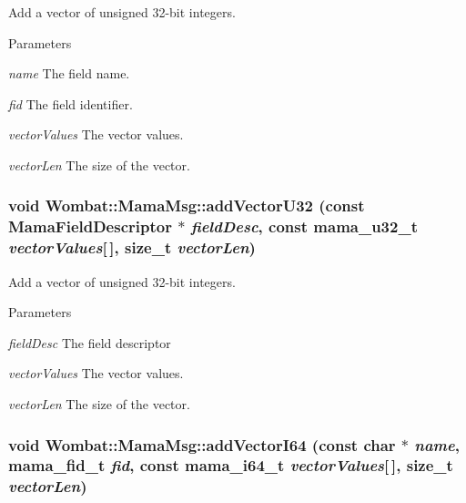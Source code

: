 Add a vector of unsigned 32-\/bit integers. 
\begin{DoxyParams}{Parameters}
\item[{\em name}]The field name. \item[{\em fid}]The field identifier. \item[{\em vectorValues}]The vector values. \item[{\em vectorLen}]The size of the vector. \end{DoxyParams}
\hypertarget{classWombat_1_1MamaMsg_a62c496a76fcfa4a772fa1770115570cd}{
\subsubsection[{addVectorU32}]{\setlength{\rightskip}{0pt plus 5cm}void Wombat::MamaMsg::addVectorU32 (const {\bf MamaFieldDescriptor} $\ast$ {\em fieldDesc}, \/  const mama\_\-u32\_\-t {\em vectorValues}\mbox{[}$\,$\mbox{]}, \/  size\_\-t {\em vectorLen})}}
\label{classWombat_1_1MamaMsg_a62c496a76fcfa4a772fa1770115570cd}


Add a vector of unsigned 32-\/bit integers. 
\begin{DoxyParams}{Parameters}
\item[{\em fieldDesc}]The field descriptor \item[{\em vectorValues}]The vector values. \item[{\em vectorLen}]The size of the vector. \end{DoxyParams}
\hypertarget{classWombat_1_1MamaMsg_a9fa5ce7b02c3d72c301a56c20500de17}{
\subsubsection[{addVectorI64}]{\setlength{\rightskip}{0pt plus 5cm}void Wombat::MamaMsg::addVectorI64 (const char $\ast$ {\em name}, \/  mama\_\-fid\_\-t {\em fid}, \/  const mama\_\-i64\_\-t {\em vectorValues}\mbox{[}$\,$\mbox{]}, \/  size\_\-t {\em vectorLen})}}
\label{classWombat_1_1MamaMsg_a9fa5ce7b02c3d72c301a56c20500de17}


